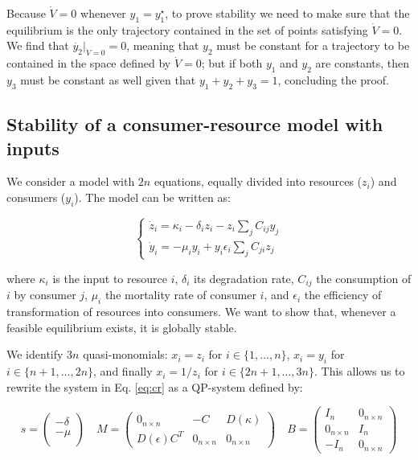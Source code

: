 \documentclass{article}
\begin{document}
Because \(\dot{V} = 0\) whenever \(y_1 = y_1^\star\), to prove stability
we need to make sure that the equilibrium is the only trajectory
contained in the set of points satisfying \(\dot{V} = 0\). We find that
\(\dot{y_2}|_{\dot{V} = 0} = 0\), meaning that \(y_2\) must be constant
for a trajectory to be contained in the space defined by
\(\dot{V} = 0\); but if both \(y_1\) and \(y_2\) are constants, then
\(y_3\) must be constant as well given that \(y_1 + y_2 + y_3 = 1\),
concluding the proof.

\hypertarget{stability-of-a-consumer-resource-model-with-inputs}{%
\subsection{Stability of a consumer-resource model with
inputs}\label{stability-of-a-consumer-resource-model-with-inputs}}

We consider a model with \(2n\) equations, equally divided into
resources (\(z_i\)) and consumers (\(y_i\)). The model can be written
as:

\begin{equation}
\label{eq:cr}
\begin{cases}
\dot{z}_i = \kappa_i - \delta_i z_i - z_i \sum_j C_{ij} y_j\\
\dot{y}_i = - \mu_i y_i + y_i \epsilon_i \sum_j C_{ji} z_j
\end{cases}
\end{equation}

where \(\kappa_i\) is the input to resource \(i\), \(\delta_i\) its
degradation rate, \(C_{ij}\) the consumption of \(i\) by consumer \(j\),
\(\mu_i\) the mortality rate of consumer \(i\), and \(\epsilon_i\) the
efficiency of transformation of resources into consumers. We want to
show that, whenever a feasible equilibrium exists, it is globally
stable.

We identify \(3n\) quasi-monomials: \(x_i = z_i\) for
\(i \in \{1, \ldots, n\}\), \(x_i = y_i\) for
\(i \in \{n + 1, \ldots, 2 n\}\), and finally \(x_i = 1 / z_i\) for
\(i \in \{2 n + 1, \ldots, 3 n\}\). This allows us to rewrite the system
in Eq. \ref{eq:cr} as a QP-system defined by:

\begin{equation}
\label{eq:crqp}
s = \begin{pmatrix}
-\delta \\
-\mu \\
\end{pmatrix} \quad 
M = \begin{pmatrix}
0_{n \times n} & -C & D(\kappa)\\
D(\epsilon)C^T & 0_{n \times n} & 0_{n \times n}
\end{pmatrix} \quad
B = \begin{pmatrix}
I_n & 0_{n \times n}\\
0_{n \times n} & I_n\\
-I_n & 0_{n \times n}
\end{pmatrix}
\end{equation}
\end{document}
